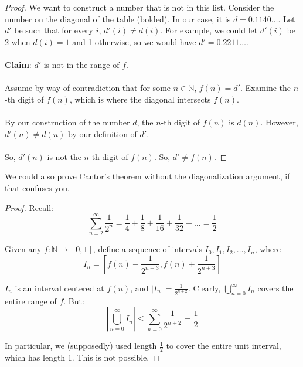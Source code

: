 \documentclass[]{article}
\theoremstyle{definition}
\begin{document}
\begin{proof}
        We want to construct a number that is not in this list. Consider the number on the diagonal of the table (bolded). In our case, it is $d = 0.1140\ldots$. Let $d'$ be such that for every $i$, $d'(i) \not = d(i)$. For example, we could let $d'(i)$ be 2 when $d(i) = 1$ and 1 otherwise, so we would have $d' = 0.2211\ldots$.
        \\ \\
        \textbf{Claim}: $d'$ is not in the range of $f$.
        \\ \\
        Assume by way of contradiction that for some $n \in \mathbb{N}$, $f(n) = d'$. Examine the $n$-th digit of $f(n)$, which is where the diagonal intersects $f(n)$.
        \\ \\
        By our construction of the number $d$, the $n$-th digit of $f(n)$ is $d(n)$. However, $d'(n) \not = d(n)$ by our definition of $d'$.
        \\ \\
        So, $d'(n)$ is not the $n$-th digit of $f(n)$. So, $d' \not = f(n)$.
      \end{proof}

      We could also prove Cantor's theorem without the diagonalization argument, if that confuses you.
      \begin{proof}
        Recall:
        $$
          \sum_{n = 2}^{\infty} \frac{1}{2^n} = \frac{1}{4} + \frac{1}{8} + \frac{1}{16} + \frac{1}{32} + \ldots = \frac{1}{2}
        $$

        Given any $f: \mathbb{N} \to [0, 1]$, define a sequence of intervals $I_0, I_1, I_2, \ldots, I_n$, where
        $$
          I_n = \left[f(n) - \frac{1}{2^{n + 3}}, f(n) + \frac{1}{2^{n + 3}}\right]
        $$

        $I_n$ is an interval centered at $f(n)$, and $|I_n| = \frac{1}{2^{n + 2}}$. Clearly, $\displaystyle \bigcup_{n = 0}^{\infty} I_n$ covers the entire range of $f$. But:
        $$
          \left|\bigcup_{n = 0}^{\infty} I_n\right| \le \sum_{n = 0}^{\infty} \frac{1}{2^{n + 2}} = \frac{1}{2}
        $$

        In particular, we (supposedly) used length $\frac{1}{2}$ to cover the entire unit interval, which has length 1. This is not possible.
      \end{proof}
\end{document}
